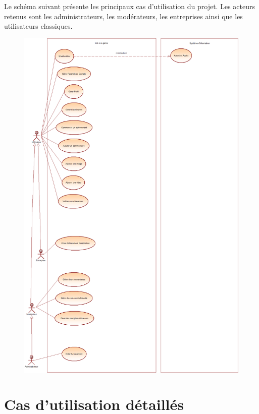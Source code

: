 \documentclass{life-fr}
\begin{document}
Le schéma suivant présente les principaux cas d'utilisation du projet. Les acteurs retenus sont les administrateurs, les modérateurs, les entreprises ainsi que les utilisateurs classiques.

\newpage

\begin{figure}[H]
  \begin{center}
    \includegraphics[width=15cm]{img/use_case_principaux.png}
  \end{center}
\end{figure}

\section{Cas d'utilisation détaillés}
\end{document}
